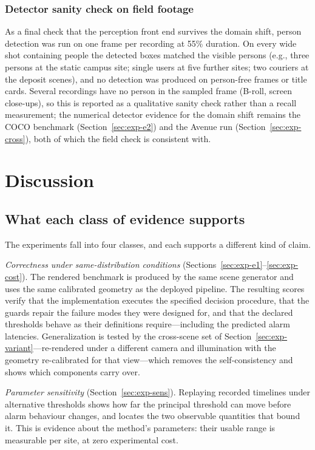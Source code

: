 \documentclass[journal,article,submit,oneauthor]{Definitions/mdpi}
\begin{document}
\subsubsection{Detector sanity check on field footage}
As a final check that the perception front end survives the domain shift, person detection
was run on one frame per recording at 55\% duration. On every wide shot containing people
the detected boxes matched the visible persons (e.g., three persons at the static campus
site; single users at five further sites; two couriers at the deposit scenes), and no
detection was produced on person-free frames or title cards. Several recordings have no
person in the sampled frame (B-roll, screen close-ups), so this is reported as a
qualitative sanity check rather than a recall measurement; the numerical detector evidence
for the domain shift remains the COCO benchmark (Section~\ref{sec:exp-e2}) and the Avenue
run (Section~\ref{sec:exp-cross}), both of which the field check is consistent with.

\section{Discussion}
\label{sec:discussion}

\subsection{What each class of evidence supports}
The experiments fall into four classes, and each supports a different kind of claim.

\emph{Correctness under same-distribution conditions} (Sections~\ref{sec:exp-e1}--\ref{sec:exp-cost}). The rendered benchmark is
produced by the same scene generator and uses the same calibrated geometry as the deployed
pipeline. The resulting scores verify that the implementation executes the specified
decision procedure, that the guards repair the failure modes they were designed for, and
that the declared thresholds behave as their definitions require---including the predicted
alarm latencies. Generalization is tested by the cross-scene set of
Section~\ref{sec:exp-variant}---re-rendered under a different camera and illumination with
the geometry re-calibrated for that view---which removes the self-consistency and shows
which components carry over.

\emph{Parameter sensitivity} (Section~\ref{sec:exp-sens}). Replaying recorded timelines under alternative
thresholds shows how far the principal threshold can move before alarm behaviour changes,
and locates the two observable quantities that bound it. This is evidence about the method's
parameters: their usable range is measurable per site, at zero experimental cost.
\end{document}
